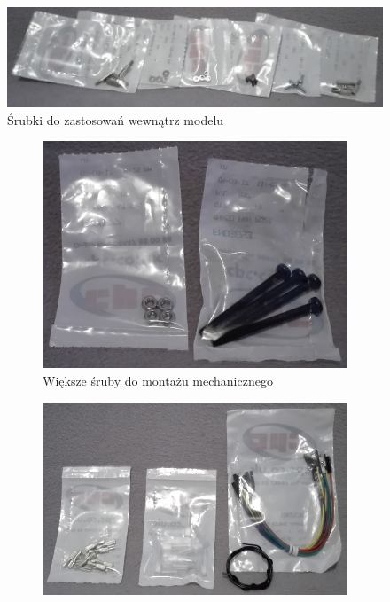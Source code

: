 \begin{figure}[H]
    \centering
    \includegraphics[width=0.9\linewidth]{photos/screws1.png}
    \caption*{Śrubki do zastosowań wewnątrz modelu}
\end{figure}
\begin{figure}[H]
    \centering
    \begin{subfigure}{0.32\textwidth}
        \centering
        \includegraphics[width=0.9\linewidth]{photos/screws2.png}
        \caption*{Większe śruby do montażu mechanicznego}
    \end{subfigure}
    \begin{subfigure}{0.32\textwidth}
        \centering
        \includegraphics[width=0.9\linewidth]{photos/cables.png}

\end{subfigure}
\end{figure}

